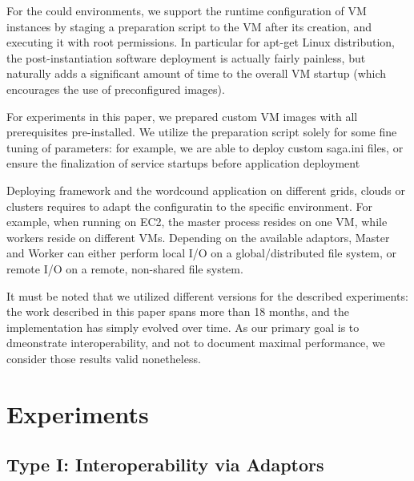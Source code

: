 \documentclass[3p,twocolumn]{elsarticle}
\begin{document}
For the could environments, we support the runtime configuration of VM
instances by staging a preparation script to the VM after its
creation, and executing it with root permissions.  In particular for
apt-get Linux distribution, the post-instantiation software deployment
is actually fairly painless, but naturally adds a significant amount
of time to the overall VM startup (which encourages the use of
preconfigured images).

For experiments in this paper, we prepared custom VM images with all
prerequisites pre-installed.  We utilize the preparation script solely
for some fine tuning of parameters: for example, we are able to deploy
custom saga.ini files, or ensure the finalization of service startups
before application deployment

Deploying \sagamapreduce framework and the wordcound application on
different grids, clouds or clusters requires to adapt the configuratin
to the specific environment.  For example, when running \sagamapreduce
on EC2, the master process resides on one VM, while workers reside on
different VMs.  Depending on the available adaptors, Master and Worker
can either perform local I/O on a global/distributed file system, or
remote I/O on a remote, non-shared file system.

It must be noted that we utilized different \smr versions for the
described experiments: the work described in this paper spans more
than 18 months, and the \smr implementation has simply evolved over
time.  As our primary goal is to dmeonstrate interoperability, and not
to document maximal performance, we consider those results valid
nonetheless.


\section{Experiments} 

\subsection{Type I: Interoperability via Adaptors}
\end{document}
